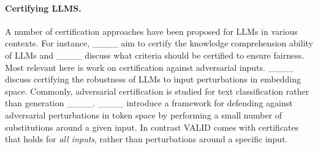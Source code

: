 \paragraph{Certifying LLMS.}
A number of certification approaches have been proposed for LLMs in various contexts. For instance, ____ aim to certify the knowledge comprehension ability of LLMs and ____ discuss what criteria should be certified to ensure fairness. Most relevant here is work on certification against adversarial inputs. ____ discuss certifying the robustness of LLMs to input perturbations in embedding space. Commonly, adversarial certification is studied for text classification rather than generation ____. ____ introduce a framework for defending against adversarial perturbations in token space by performing a small number of substitutions around a given input. In contrast VALID comes with certificates that holds for \emph{all inputs}, rather than perturbations around a specific input.

\vspace{-2pt}